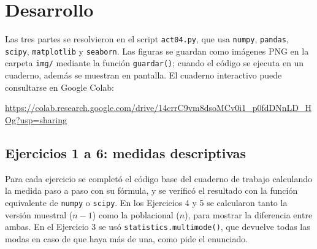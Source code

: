 \documentclass[11pt,letterpaper]{article}
\begin{document}
\section{Desarrollo}

Las tres partes se resolvieron en el script \texttt{act04.py}, que usa \texttt{numpy}, \texttt{pandas}, \texttt{scipy}, \texttt{matplotlib} y \texttt{seaborn}. Las figuras se guardan como imágenes PNG en la carpeta \texttt{img/} mediante la función \texttt{guardar()}; cuando el código se ejecuta en un cuaderno, además se muestran en pantalla. El cuaderno interactivo puede consultarse en Google Colab:

\begin{center}
    \url{https://colab.research.google.com/drive/14crrC9vm8dsoMCv0i1_p0fdDNnLD_HOg?usp=sharing}
\end{center}

\subsection{Ejercicios 1 a 6: medidas descriptivas}

Para cada ejercicio se completó el código base del cuaderno de trabajo calculando la medida paso a paso con su fórmula, y se verificó el resultado con la función equivalente de \texttt{numpy} o \texttt{scipy}. En los Ejercicios 4 y 5 se calcularon tanto la versión muestral ($n - 1$) como la poblacional ($n$), para mostrar la diferencia entre ambas. En el Ejercicio 3 se usó \texttt{statistics.multimode()}, que devuelve todas las modas en caso de que haya más de una, como pide el enunciado.
\end{document}
